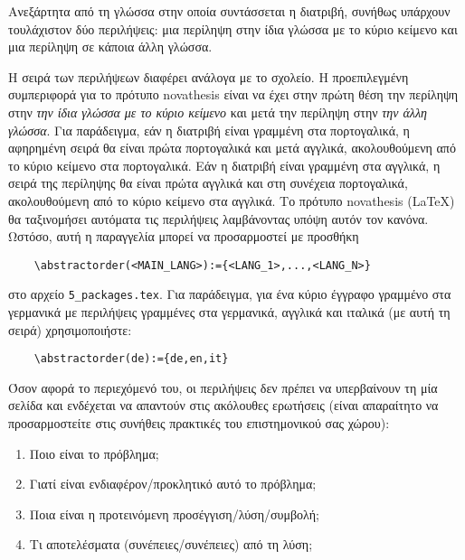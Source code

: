 
%


Ανεξάρτητα από τη γλώσσα στην οποία συντάσσεται η διατριβή, συνήθως υπάρχουν τουλάχιστον δύο περιλήψεις: μια περίληψη στην ίδια γλώσσα με το κύριο κείμενο και μια περίληψη σε κάποια άλλη γλώσσα.

Η σειρά των περιλήψεων διαφέρει ανάλογα με το σχολείο. Η προεπιλεγμένη συμπεριφορά για το πρότυπο \gls{novathesis} είναι να έχει στην πρώτη θέση την περίληψη στην \emph{την ίδια γλώσσα με το κύριο κείμενο} και μετά την περίληψη στην \emph{την άλλη γλώσσα}. Για παράδειγμα, εάν η διατριβή είναι γραμμένη στα πορτογαλικά, η αφηρημένη σειρά θα είναι πρώτα πορτογαλικά και μετά αγγλικά, ακολουθούμενη από το κύριο κείμενο στα πορτογαλικά. Εάν η διατριβή είναι γραμμένη στα αγγλικά, η σειρά της περίληψης θα είναι πρώτα αγγλικά και στη συνέχεια πορτογαλικά, ακολουθούμενη από το κύριο κείμενο στα αγγλικά.
%
Το πρότυπο \gls{novathesis} (\LaTeX) θα ταξινομήσει αυτόματα τις περιλήψεις λαμβάνοντας υπόψη αυτόν τον κανόνα. Ωστόσο, αυτή η παραγγελία μπορεί να προσαρμοστεί με προσθήκη
\begin{verbatim}
    \abstractorder(<MAIN_LANG>):={<LANG_1>,...,<LANG_N>}
\end{verbatim}
\noindent στο αρχείο \verb!5_packages.tex!. Για παράδειγμα, για ένα κύριο έγγραφο γραμμένο στα γερμανικά με περιλήψεις γραμμένες στα γερμανικά, αγγλικά και ιταλικά (με αυτή τη σειρά) χρησιμοποιήστε:
\begin{verbatim}
    \abstractorder(de):={de,en,it}
\end{verbatim}

Όσον αφορά το περιεχόμενό του, οι περιλήψεις δεν πρέπει να υπερβαίνουν τη μία σελίδα και ενδέχεται να απαντούν στις ακόλουθες ερωτήσεις (είναι απαραίτητο να προσαρμοστείτε στις συνήθεις πρακτικές του επιστημονικού σας χώρου):

\begin{enumerate}
  \item Ποιο είναι το πρόβλημα;
  \item Γιατί είναι ενδιαφέρον/προκλητικό αυτό το πρόβλημα;
  \item Ποια είναι η προτεινόμενη προσέγγιση/λύση/συμβολή;
  \item Τι αποτελέσματα (συνέπειες/συνέπειες) από τη λύση;
\end{enumerate}

